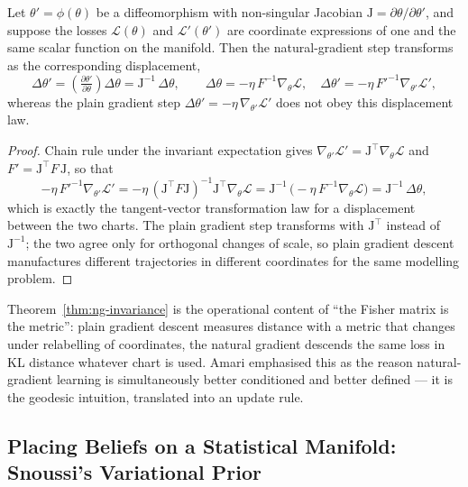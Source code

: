 \begin{theorem}
\label{thm:ng-invariance}
Let $\theta' = \phi(\theta)$ be a diffeomorphism with non-singular Jacobian
$\mathrm{J} = \partial\theta/\partial\theta'$, and suppose the losses
$\mathcal{L}(\theta)$ and $\mathcal{L}'(\theta')$ are coordinate expressions
of one and the same scalar function on the manifold. Then the natural-gradient
step transforms as the corresponding displacement,
\[
\Delta\theta' = \left(\tfrac{\partial\theta'}{\partial\theta}\right)
\Delta\theta = \mathrm{J}^{-1}\,\Delta\theta,
\qquad
\Delta\theta = -\eta\,F^{-1}\nabla_\theta\mathcal{L},
\quad
\Delta\theta' = -\eta\,F'^{-1}\nabla_{\theta'}\mathcal{L}',
\]
whereas the plain gradient step $\Delta\theta' = -\eta\,\nabla_{\theta'}
\mathcal{L}'$ does not obey this displacement law.
\end{theorem}

\begin{proof}
Chain rule under the invariant expectation gives
$\nabla_{\theta'}\mathcal{L}' = \mathrm{J}^{\top}\nabla_\theta\mathcal{L}$ and
$F' = \mathrm{J}^{\top} F\, \mathrm{J}$, so that
\[
-\eta\,F'^{-1}\nabla_{\theta'}\mathcal{L}'
= -\eta\,(\mathrm{J}^{\top}F\mathrm{J})^{-1}\mathrm{J}^{\top}
\nabla_\theta\mathcal{L}
= \mathrm{J}^{-1}\,\bigl(-\eta\,F^{-1}\nabla_\theta\mathcal{L}\bigr)
= \mathrm{J}^{-1}\,\Delta\theta,
\]
which is exactly the tangent-vector transformation law for a displacement
between the two charts. The plain gradient step transforms with
$\mathrm{J}^{\top}$ instead of $\mathrm{J}^{-1}$; the two agree only for
orthogonal changes of scale, so plain gradient descent manufactures different
trajectories in different coordinates for the same modelling problem.
\end{proof}

\begin{remark}
Theorem~\ref{thm:ng-invariance} is the operational content of ``the Fisher
matrix is the metric'': plain gradient descent measures distance with a
metric that changes under relabelling of coordinates, the natural gradient
descends the same loss in KL distance whatever chart is used. Amari
emphasised this as the reason natural-gradient learning is simultaneously
better conditioned and better defined --- it is the geodesic intuition,
translated into an update rule.
\end{remark}

\subsection{Placing Beliefs on a Statistical Manifold: Snoussi's Variational
Prior}
\label{sec:info-geo-prior}


